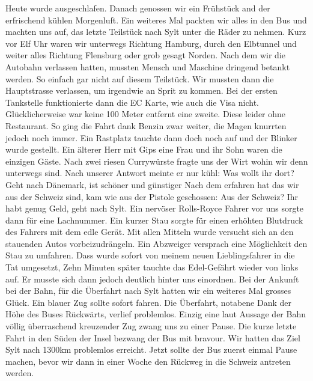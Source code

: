 Heute wurde ausgeschlafen.
Danach genossen wir ein Frühstück and der erfrischend kühlen Morgenluft.
Ein weiteres Mal packten wir alles in den Bus und machten uns auf, das letzte Teilstück nach Sylt unter die Räder zu nehmen.
Kurz vor Elf Uhr waren wir unterwegs Richtung Hamburg, durch den Elbtunnel und weiter alles Richtung Flensburg oder grob gesagt Norden.
Nach dem wir die Autobahn verlassen hatten, mussten Mensch und Maschine dringend betankt werden.
So einfach gar nicht auf diesem Teilstück.
Wir mussten dann die Hauptstrasse verlassen, um irgendwie an Sprit zu kommen.
Bei der ersten Tankstelle funktionierte dann die EC Karte, wie auch die Visa nicht.
Glücklicherweise war keine 100 Meter entfernt eine zweite.
Diese leider ohne Restaurant.
So ging die Fahrt dank Benzin zwar weiter, die Magen knurrten jedoch noch immer.
Ein Rastplatz tauchte dann doch noch auf und der Blinker wurde gestellt.
Ein älterer Herr mit Gips eine Frau und ihr Sohn waren die einzigen Gäste.
Nach zwei riesen Currywürste fragte uns der \glqq Wirt\grqq{} wohin wir denn unterwegs sind.
Nach unserer Antwort meinte er nur kühl: \glqq Was wollt ihr dort? Geht nach Dänemark, ist schöner und günstiger\grqq{}
Nach dem erfahren hat das wir aus der Schweiz sind, kam wie aus der Pistole geschossen: \glqq Aus der Schweiz? Ihr habt genug Geld, geht nach Sylt.\grqq{}
Ein nervöser Rolls-Royce Fahrer vor uns sorgte dann für eine Lachnummer.
Ein kurzer Stau sorgte für einen erhöhten Blutdruck des Fahrers mit dem edle Gerät.
Mit allen Mitteln wurde versucht sich an den stauenden Autos vorbeizudrängeln. 
Ein Abzweiger versprach eine Möglichkeit den Stau zu umfahren.
Dass wurde sofort von meinem neuen Lieblingsfahrer in die Tat umgesetzt,
Zehn Minuten später tauchte das Edel-Gefährt wieder von links auf. 
Er musste sich dann jedoch deutlich hinter uns einordnen.
Bei der Ankunft bei der Bahn, für die Überfahrt nach Sylt hatten wir ein weiteres Mal grosses Glück.
Ein blauer Zug sollte sofort fahren.
Die Überfahrt, notabene Dank der Höhe des Buses Rückwärts, verlief problemlos.
Einzig eine laut Aussage der Bahn völlig überraschend kreuzender Zug zwang uns zu einer Pause.
Die kurze letzte Fahrt in den Süden der Insel bezwang der Bus mit bravour.
Wir hatten das Ziel Sylt nach 1300km problemlos erreicht.
Jetzt sollte der Bus zuerst einmal Pause machen, bevor wir dann in einer Woche den Rückweg in die Schweiz antreten werden.

